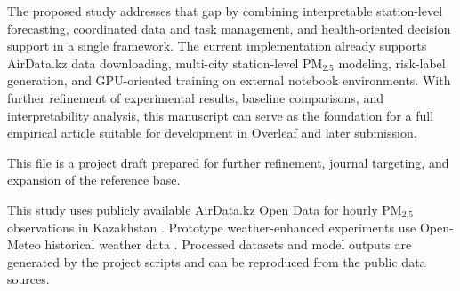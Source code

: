 \documentclass[pdflatex,sn-mathphys-num]{sn-jnl}
\begin{document}
The proposed study addresses that gap by combining interpretable station-level forecasting, coordinated data and task management, and health-oriented decision support in a single framework. The current implementation already supports AirData.kz data downloading, multi-city station-level PM$_{2.5}$ modeling, risk-label generation, and GPU-oriented training on external notebook environments. With further refinement of experimental results, baseline comparisons, and interpretability analysis, this manuscript can serve as the foundation for a full empirical article suitable for development in Overleaf and later submission.

\backmatter


This file is a project draft prepared for further refinement, journal targeting, and expansion of the reference base.


This study uses publicly available AirData.kz Open Data for hourly PM$_{2.5}$ observations in Kazakhstan \cite{airdatakz2026}. Prototype weather-enhanced experiments use Open-Meteo historical weather data \cite{openmeteo2026}. Processed datasets and model outputs are generated by the project scripts and can be reproduced from the public data sources.


\end{document}
